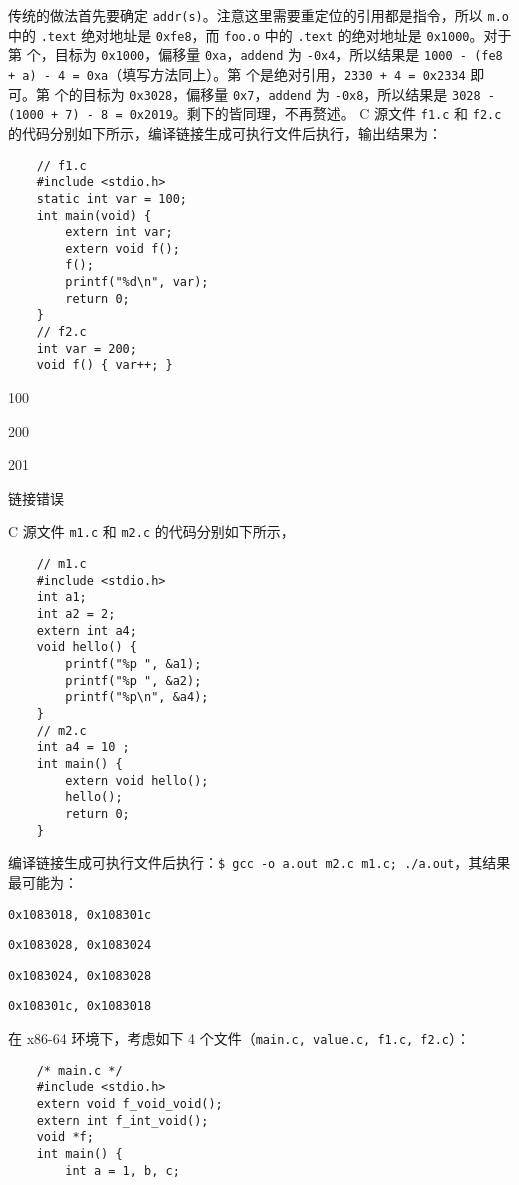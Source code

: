 \begin{problems}
        传统的做法首先要确定 \verb|addr(s)|。注意这里需要重定位的引用都是指令，所以 \verb|m.o| 中的 \verb|.text| 绝对地址是 \verb|0xfe8|，而 \verb|foo.o| 中的 \verb|.text| 的绝对地址是 \verb|0x1000|。对于第  个，目标为 \verb|0x1000|，偏移量 \verb|0xa|，\verb|addend| 为 \verb|-0x4|，所以结果是 \verb|1000 - (fe8 + a) - 4 = 0xa|（填写方法同上）。第  个是绝对引用，\verb|2330 + 4 = 0x2334| 即可。第  个的目标为 \verb|0x3028|，偏移量 \verb|0x7|，\verb|addend| 为 \verb|-0x8|，所以结果是 \verb|3028 - (1000 + 7) - 8 = 0x2019|。剩下的皆同理，不再赘述。
         C 源文件 \verb|f1.c| 和 \verb|f2.c| 的代码分别如下所示，编译链接生成可执行文件后执行，输出结果为：
        \begin{verbatim}
    // f1.c
    #include <stdio.h>
    static int var = 100;
    int main(void) {
        extern int var;
        extern void f();
        f();
        printf("%d\n", var);
        return 0;
    }
    // f2.c
    int var = 200;
    void f() { var++; }
        \end{verbatim}
        \begin{choices}
            \item 100
            \item 200
            \item 201
            \item 链接错误
        \end{choices}
         C 源文件 \verb|m1.c| 和 \verb|m2.c| 的代码分别如下所示，
        \begin{verbatim}
    // m1.c
    #include <stdio.h>
    int a1;
    int a2 = 2;
    extern int a4;
    void hello() {
        printf("%p ", &a1);
        printf("%p ", &a2);
        printf("%p\n", &a4);
    }
    // m2.c
    int a4 = 10 ;
    int main() {
        extern void hello();
        hello();
        return 0; 
    }
        \end{verbatim}
        编译链接生成可执行文件后执行：\verb|$ gcc -o a.out m2.c m1.c; ./a.out|，其结果最可能为：
        \begin{choices}
            \item \verb|0x1083018, 0x108301c|
            \item \verb|0x1083028, 0x1083024|
            \item \verb|0x1083024, 0x1083028|
            \item \verb|0x108301c, 0x1083018|
        \end{choices}
         在 x86-64 环境下，考虑如下 4 个文件（\verb|main.c, value.c, f1.c, f2.c|）：
        \begin{verbatim}
    /* main.c */
    #include <stdio.h>
    extern void f_void_void();
    extern int f_int_void();
    void *f;
    int main() {
        int a = 1, b, c;


\end{verbatim}
\end{problems}
